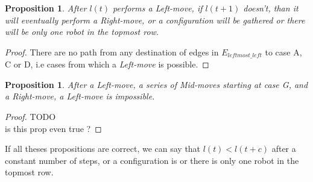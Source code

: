 \documentclass[11pt, a4paper]{article}
\theoremstyle{plain}
\newtheorem{prop}[thm]{Proposition}
\theoremstyle{definition}
\theoremstyle{remark}
\begin{document}
\begin{prop}
After $l(t)$ performs a \emph{Left-move}, if $l(t+1)$ doesn't, than it will
eventually perform a \emph{Right-move}, or a \Gathered configuration will be
gathered or there will be only one robot in the topmost row.
\end{prop}

\begin{proof}

There are no path from any destination of edges in $E_{leftmost\_left}$ to case
A, C or D, i.e cases from which a \emph{Left-move} is possible.
\end{proof}


\begin{prop}
After a \emph{Left-move}, a series of \emph{Mid-move}s starting at case G,
and a \emph{Right-move}, a \emph{Left-move} is impossible.
\end{prop}

\begin{proof}
TODO\\
is this prop even true ?
\end{proof}

If all theses propositions are correct, we can say that $l(t) < l(t+c)$ after a
constant number of steps, or a configuration is \Gathered or there is only one
robot in the topmost row.

\appendix
\end{document}
